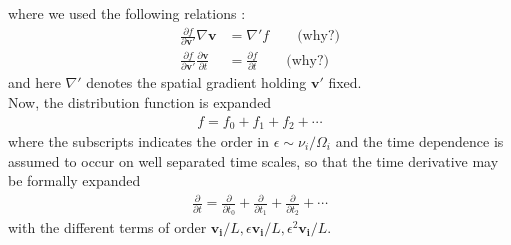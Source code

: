 where we used the following relations : 
\begin{align}
    \frac{\partial f}{\partial \bm{v}'} \nabla \bm{v} &= \nabla 'f \qquad \text{(why?)} \\
    \frac{\partial f}{\partial \bm{v}'} \frac{\partial \bm{v}}{\partial t} &= \frac{\partial f}{\partial t} \qquad \text{(why?)}
\end{align}
and here $\nabla '$ denotes the spatial gradient holding $\bm{v}'$ fixed. \\
Now, the distribution function is expanded
\begin{align}
    f = f_0 + f_1 + f_2 + \cdots
\end{align}
where the subscripts indicates the order in $\epsilon \sim \nu_i / \Omega_i$ and the time dependence is assumed to occur on well separated time scales, so that the time derivative may be formally expanded
\begin{align}
    \frac{\partial}{\partial t} = \frac{\partial}{\partial t_0} + \frac{\partial}{\partial t_1} + \frac{\partial}{\partial t_2} + \cdots
\end{align}
with the different terms of order $\bm{v_i}/L, \epsilon \bm{v_i}/L , \epsilon^2 \bm{v_i}/L$.
